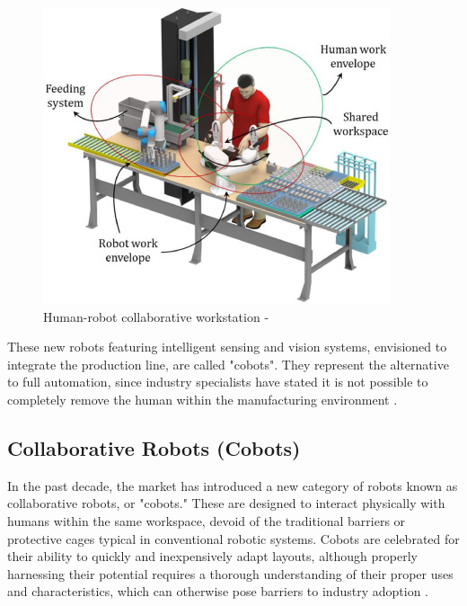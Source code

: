 \begin{figure}[!htbp]
    \centering
    \includegraphics[width=0.55\linewidth]{figs/human-robot-collab-env.jpg}
    \caption{Human-robot collaborative workstation - \cite{MALIK2021102092}} 
    \label{fig:hrc-workstation}
\end{figure} 


These new robots featuring intelligent sensing and vision systems, envisioned to integrate the production line, are called "cobots". 
They represent the alternative to full automation, since industry specialists have stated it is not possible to completely remove the 
human within the manufacturing environment \cite{Weiss2021}.


\subsection{Collaborative Robots (Cobots)} 


In the past decade, the market has introduced a new category of robots known as collaborative robots, or "cobots." These are designed to interact 
physically with humans within the same workspace, devoid of the traditional barriers or protective cages typical in conventional robotic systems. 
Cobots are celebrated for their ability to quickly and inexpensively adapt layouts, although properly harnessing their potential requires a thorough 
understanding of their proper uses and characteristics, which can otherwise pose barriers to industry adoption \cite{robotics8040100}.


